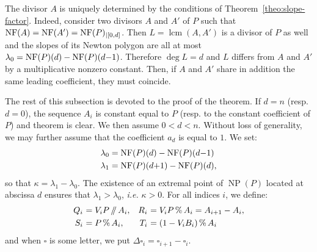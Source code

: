 \documentclass{sig-alternate-2013}
\DeclareMathOperator{\NP}{NP}
\DeclareMathOperator{\lcm}{lcm}
\newcommand{\NF}{\text{\rm NF}}
\renewcommand{\mod}{\,\%\,}
\renewcommand{\div}{\,/\hspace{-0.3em}/\,}
\begin{document}

%

\begin{rem}
\label{rem:unicity}
The divisor $A$ is uniquely determined by the conditions of 
Theorem~\ref{theo:slope-factor}. Indeed, consider two divisors
$A$ and $A'$ of $P$ such that $\NF(A) = \NF(A') = \NF(P)_{|[0,d]}$.
Then $L = \lcm(A,A')$ is a divisor of $P$ as well and the 
slopes of its Newton polygon are all at most $\lambda_0 = \NF(P)(d) - 
\NF(P)(d{-}1)$. Therefore $\deg L = d$ and $L$ differs from $A$ and
$A'$ by a multiplicative nonzero constant. Then, if $A$ and $A'$ 
share in addition the same leading coefficient, they must coincide.
\end{rem}

The rest of this subsection is devoted to the proof of the theorem.
If $d = n$ (resp. $d = 0$), the sequence $A_i$ is constant equal to
$P$ (resp. to the constant coefficient of $P$) and theorem is clear.
We then assume $0 < d < n$. Without loss of generality, we may further 
assume that the coefficient $a_d$ is equal to $1$. We set:
\begin{align*}
\lambda_0 & = \NF(P)(d) - \NF(P)(d{-}1) \\
\lambda_1 & = \NF(P)(d{+}1) - \NF(P)(d),
\end{align*}
so that $\kappa = \lambda_1 - \lambda_0$.
The existence of an extremal point of $\NP(P)$ located at abscissa
$d$ ensures that $\lambda_1 > \lambda_0$, \emph{i.e.} $\kappa > 0$.
For all indices $i$, we define:
$$\begin{array}{r@{\,\,}lr@{\,\,}l}
Q_i &= V_i P \div A_i, &
R_i & = V_i P \mod A_i = A_{i+1} - A_i, 
\smallskip \\
S_i &= P \mod A_i, &
T_i &= (1 - V_i B_i) \mod A_i
\end{array}$$
and when $\square$ is some letter, we put $\Delta \square_i = \square_{i+1} 
- \square_i$.
\end{document}

